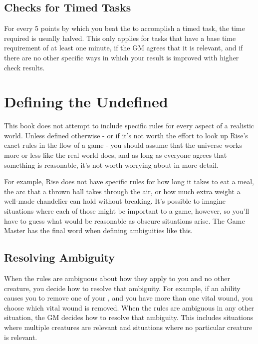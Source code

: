   \subsection{Checks for Timed Tasks}
    For every 5 points by which you beat the  to accomplish a timed task, the time required is usually halved.
    This only applies for tasks that have a base time requirement of at least one minute, if the GM agrees that it is relevant, and if there are no other specific ways in which your result is improved with higher check results.

\section{Defining the Undefined}
  This book does not attempt to include specific rules for every aspect of a realistic world.
  Unless defined otherwise - or if it's not worth the effort to look up Rise's exact rules in the flow of a game - you should assume that the universe works more or less like the real world does, and as long as everyone agrees that something is reasonable, it's not worth worrying about in more detail.

  For example, Rise does not have specific rules for how long it takes to eat a meal, the arc that a thrown ball takes through the air, or how much extra weight a well-made chandelier can hold without breaking.
  It's possible to imagine situations where each of those might be important to a game, however, so you'll have to guess what would be reasonable as obscure situations arise.
  The Game Master has the final word when defining ambiguities like this.

  \subsection{Resolving Ambiguity}\label{Resolving Ambiguity}
    When the rules are ambiguous about how they apply to you and no other creature, you decide how to resolve that ambiguity.
    For example, if an ability causes you to remove one of your , and you have more than one vital wound, you choose which vital wound is removed.
    When the rules are ambiguous in any other situation, the GM decides how to resolve that ambiguity.
    This includes situations where multiple creatures are relevant and situations where no particular creature is relevant.
